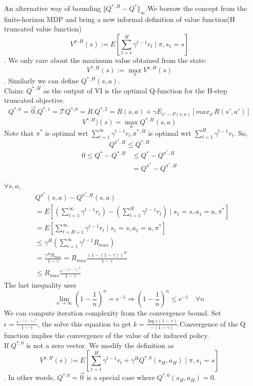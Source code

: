 \documentclass{report}
\begin{document}
An alternative way of bounding $\Vert Q^{*, H}-Q^{*}\Vert_{\infty}$.We borrow the concept from the finite-horizon MDP and bring a new informal definition of value function(H truncated value function)\[ V^{\pi, H}(s) := E[\sum_{t=1}^{H}\gamma^{t-1}r_t \mid \pi, s_1=s]\]. We only care about the maximum value obtained from the state: \[ V^{*, H}(s) := \max_{\pi}V^{\pi, H}(s)\]. Similarly we can define $Q^{*,H}(s,a)$.\\ 
Claim: $Q^{*,H}$ as the output of VI is the optimal Q-function for the H-step truncated objective.\[Q^{*,0}=\Vec{0}. Q^{*,1}=\mathcal{T}Q^{*,0}=R. Q^{*,2}=R(s,a)+\gamma E_{s'\sim P(s,a)}[max_{a'}R(s',a')]\]
\[V^{*,H})(s)=\max_{a}Q^{*,H}(s,a)\]
Note that $\pi^*$ is optimal wrt $\sum_{t=1}^{\infty}\gamma^{t-1}r_t$.$\pi^{*,H}$ is optimal wrt $\sum_{t=1}^{H}\gamma^{t-1}r_t$. So, 
\[
Q^{\pi^*,H} \leq Q^{*,H}
\]
\begin{equation*}
\begin{split}
      0 \leq Q^*-Q^{*,H} &\leq Q^*-Q^{\pi^*,H} \\
    &= Q^{\pi^*}-Q^{\pi^*,H}   
\end{split}
\end{equation*}

$\forall s,a$, \begin{equation*}
    \begin{split}
        &Q^{\pi^*}(s,a)-Q^{\pi^*,H}(s,a) \\
        &= E[(\sum_{t=1}^{\infty}\gamma^{t-1}r_t)-(\sum_{t=1}^{H}\gamma^{t-1}r_t)\mid s_1=s,a_1=a,\pi^*] \\
        &=E[\sum_{t=H+1}^{\infty}\gamma^{t-1}r_t \mid s_1=s,a_1=a,\pi^*]\\
        &\leq \gamma^H(\sum_{t=1}^{\infty} \gamma^{t-1}R_{max}) \\
        &=\frac{\gamma^H R_{max}}{1-\gamma}=R_{max}\frac{(1-(1-\gamma))^H}{1-\gamma} \\
        & \leq R_{max}\frac{e^{-(1-\gamma)^k}}{1-\gamma}
    \end{split}
\end{equation*}
The last inequality uses\[
\lim_{n\rightarrow \infty}(1-\frac{1}{n})^n=e^{-1} \Rightarrow (1-\frac{1}{n})^n \leq e^{-1} \quad \forall n
\]
We can compute iteration complexity from the convergence bound. Set $\epsilon=\frac{e^{-(1-\gamma)^k}}{1-\gamma}$, the solve this equation to get $k=\frac{\log{\epsilon(1-\gamma)}}{-(1-\gamma)}$.Convergence of the Q function implies the convergence of the value of the induced policy.\\
If $Q^{*,0}$ is not a zero vector. We modify the definition as \[ V^{\pi, H}(s) := E[\sum_{t=1}^{H}\gamma^{t-1}r_t+\gamma^{H}Q^{*,0}(s_H,a_H) \mid \pi, s_1=s]\]. In other words, $Q^{*,0}=\Vec{0}$ is a special case where $Q^{*,0}(s_H,a_H)=0$.
\end{document}
